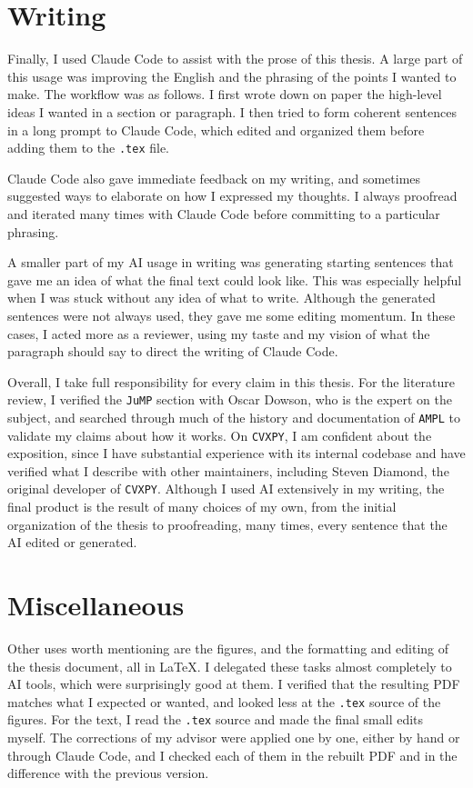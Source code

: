 \section*{Writing}

Finally, I used Claude Code to assist with the prose of this thesis. A large part of this usage
was improving the English and the phrasing of the points I wanted to make. The workflow was as
follows. I first wrote down on paper the high-level ideas I wanted in a section or paragraph.
I then tried to form coherent sentences in a long prompt to Claude Code, which edited and
organized them before adding them to the \texttt{.tex} file.

Claude Code also gave immediate feedback on my writing, and sometimes suggested ways to
elaborate on how I expressed my thoughts. I always proofread and iterated many times with
Claude Code before committing to a particular phrasing.

A smaller part of my AI usage in writing was generating starting sentences that gave me an idea
of what the final text could look like. This was especially helpful when I was stuck without any
idea of what to write. Although the generated sentences were not always used, they gave me some
editing momentum. In these cases, I acted more as a reviewer, using my taste and my vision of
what the paragraph should say to direct the writing of Claude Code.

Overall, I take full responsibility for every claim in this thesis. For the literature review,
I verified the \texttt{JuMP} section with Oscar Dowson, who is the expert on the subject, and
searched through much of the history and documentation of \texttt{AMPL} to validate my claims
about how it works. On \texttt{CVXPY}, I am confident about the exposition, since I have
substantial experience with its internal codebase and have verified what I describe with other
maintainers, including Steven Diamond, the original developer of \texttt{CVXPY}. Although I used
AI extensively in my writing, the final product is the result of many choices of my own, from
the initial organization of the thesis to proofreading, many times, every sentence that the AI
edited or generated.

\section*{Miscellaneous}

Other uses worth mentioning are the figures, and the formatting and editing of the thesis
document, all in \LaTeX. I delegated these tasks almost completely to AI tools, which were
surprisingly good at them. I verified that the resulting PDF matches what I expected or
wanted, and looked less at the \texttt{.tex} source of the figures. For the text, I read the
\texttt{.tex} source and made the final small edits myself. The corrections of my advisor were
applied one by one, either by hand or through Claude Code, and I checked each of them in the
rebuilt PDF and in the difference with the previous version.
